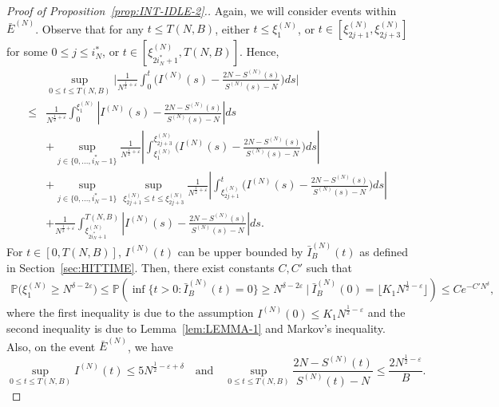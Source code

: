 \documentclass[11pt, reqno]{article}
\numberwithin{equation}{section}
\numberwithin{theorem}{section}
\begin{document}
\begin{proof}[Proof of Proposition~\ref{prop:INT-IDLE-2}.]
Again, we will consider events within $\bar{E}^{(N)}$.
Observe that for any $t \le T(N,B)$, either $t \le \xi^{(N)}_1$, or $t \in [\xi^{(N)}_{2j+1}, \xi^{(N)}_{2j+3}]$ for some $0 \le j \le i^*_N$, or $t \in [\xi^{(N)}_{2i^*_N+1}, T(N,B)]$. Hence,  
\begin{equation}\label{eq:Prop6.5-1}
    \begin{split}
    &\sup_{0\leq t\leq T(N,B)}\Big|\frac{1}{N^{\frac{1}{2}+\varepsilon}}\int_0^{t}\Big(I^{(N)}(s)-\frac{2N-S^{(N)}(s)}{S^{(N)}(s)-N}\Big)ds\Big|\\
    \leq & \frac{1}{N^{\frac{1}{2}+\varepsilon}}\int_0^{\xi^{(N)}_1}\left| I^{(N)}(s)-\frac{2N-S^{(N)}(s)}{S^{(N)}(s)-N}\right| ds\\
    &+\sup_{j\in\{0,...,i^*_N-1\}}\frac{1}{N^{\frac{1}{2}+\varepsilon}}\left|\int_{\xi^{(N)}_1}^{\xi^{(N)}_{2j+3}}\Big(I^{(N)}(s)-\frac{2N-S^{(N)}(s)}{S^{(N)}(s)-N}\Big)ds\right|\\
    &+\sup_{j\in\{0,...,i^*_N-1\}}\sup_{\xi^{(N)}_{2j+1}\leq t\leq\xi^{(N)}_{2j+3} }\frac{1}{N^{\frac{1}{2}+\varepsilon}}\left|\int_{\xi^{(N)}_{2j+1}}^t\Big(I^{(N)}(s)-\frac{2N-S^{(N)}(s)}{S^{(N)}(s)-N}\Big)ds\right|\\
    &+ \frac{1}{N^{\frac{1}{2}+\varepsilon}}\int_{\xi^{(N)}_{2i^*_N+1}}^{T(N,B)}\left| I^{(N)}(s)-\frac{2N-S^{(N)}(s)}{S^{(N)}(s)-N}\right| ds.
    \end{split}
\end{equation}
For $t\in[0,T(N,B)]$, $I^{(N)}(t)$ can be upper bounded by $\bar{I}^{(N)}_B(t)$ as defined in Section~\ref{sec:HITTIME}. Then, there exist constants $C, C'$ such that 
\begin{equation}\label{eq:Prop6.5-2}
   \begin{split}
        \mathbb{P}\big(\xi^{(N)}_1\geq N^{\delta-2\varepsilon}\big)
        \leq \mathbb{P}(\inf\{t>0:\bar{I}^{(N)}_B(t)=0\} \geq N^{\delta-2\varepsilon}\ \big|\ \bar{I}^{(N)}_B(0)=\lfloor K_1N^{\frac{1}{2}-\varepsilon}\rfloor)\leq C e^{-C'N^{\delta}},
   \end{split}
\end{equation}
where the first inequality is due to the assumption $I^{(N)}(0)\leq K_1N^{\frac{1}{2}-\varepsilon}$ and the second inequality is due to Lemma~\ref{lem:LEMMA-1} and Markov's inequality.
Also, on the event $\bar{E}^{(N)}$, we have 
\begin{equation}\label{inert}
\sup_{0\leq t\leq T(N,B)}I^{(N)}(t)\leq 5 N^{\frac{1}{2}-\varepsilon+\delta}\quad\text{and}\quad \sup_{0\leq t\leq T(N,B)}\frac{2N-S^{(N)}(t)}{S^{(N)}(t)-N}\leq \frac{2N^{\frac{1}{2}-\varepsilon}}{B}.

\end{equation}
\end{proof}
\end{document}
